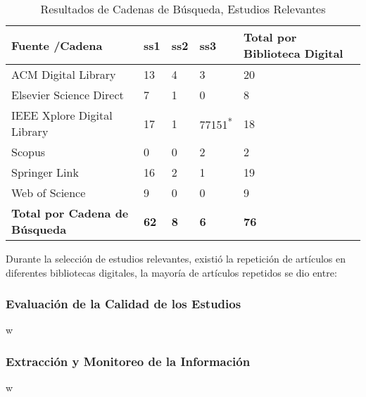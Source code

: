 \documentclass[fleqn,10pt]{SelfArx} %
\begin{document}
    \begin{table}
    \begin{center}
        \caption{Resultados de Cadenas de Búsqueda, Estudios Relevantes}
        \label{table:ResultsSearchStringOutStandingStudies}
        \begin{tabular}{| p{2.5cm} | p{.6cm} | p{.6cm} | p{.8cm} | p{1.5cm} |}
            \toprule
            \hline
            \textbf{Fuente /Cadena} & \textbf{ss1} & \textbf{ss2} & \textbf{ss3} & \textbf{Total por Biblioteca Digital}\\ \hline
            ACM Digital Library & 13 & 4 & 3 & 20 \\ \hline
            Elsevier Science Direct & 7 & 1 & 0 & 8\\ \hline
            IEEE Xplore Digital Library & 17 & 1 & 77151\textsuperscript{*} & 18\\ \hline
            Scopus & 0 & 0 & 2 & 2\\ \hline
            Springer Link & 16 & 2 & 1 &  19\\ \hline
            Web of Science & 9 & 0 & 0 & 9 \\ \hline
            \textbf{Total por Cadena de Búsqueda} & \textbf{62} & \textbf{8} & \textbf{6} & \textbf{76}\\ \hline
        \end{tabular}
    \end{center}
    \end{table}
    
    Durante la selección de estudios relevantes, existió la repetición de artículos en diferentes bibliotecas digitales, la mayoría de artículos repetidos se dio entre: 

	\subsubsection{Evaluación de la Calidad de los Estudios}
    w

	\subsubsection{Extracción y Monitoreo de la Información}
    w
	
\end{document}
